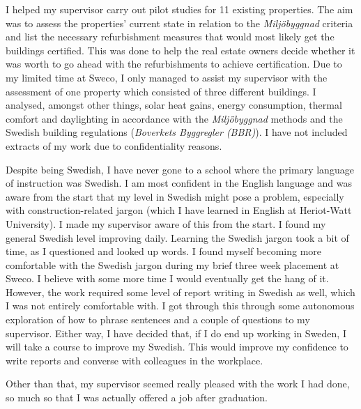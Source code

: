 I helped my supervisor carry out pilot studies for 11 existing properties.
The aim was to assess the properties' current state in relation to the \textit{Milj\"obyggnad} criteria and list the necessary refurbishment measures that would most likely get the buildings certified.
This was done to help the real estate owners decide whether it was worth to go ahead with the refurbishments to achieve certification.
Due to my limited time at Sweco, I only managed to assist my supervisor with the assessment of one property which consisted of three different buildings.
I analysed, amongst other things, solar heat gains, energy consumption, thermal comfort and daylighting in accordance with the \textit{Milj\"obyggnad} methods and the Swedish building regulations (\textit{Boverkets Byggregler (BBR)}).
I have not included extracts of my work due to confidentiality reasons.


Despite being Swedish, I have never gone to a school where the primary language of instruction was Swedish.
I am most confident in the English language and was aware from the start that my level in Swedish might pose a problem, especially with construction-related jargon (which I have learned in English at Heriot-Watt University).
I made my supervisor aware of this from the start.
I found my general Swedish level improving daily.
Learning the Swedish jargon took a bit of time, as I questioned and looked up words.
I found myself becoming more comfortable with the Swedish jargon during my brief three week placement at Sweco.
I believe with some more time I would eventually get the hang of it.
However, the work required some level of report writing in Swedish as well, which I was not entirely comfortable with.
I got through this through some autonomous exploration of how to phrase sentences and a couple of questions to my supervisor.
Either way, I have decided that, if I do end up working in Sweden, I will take a course to improve my Swedish.
This would improve my confidence to write reports and converse with colleagues in the workplace.

Other than that, my supervisor seemed really pleased with the work I had done, so much so that I was actually offered a job after graduation.
